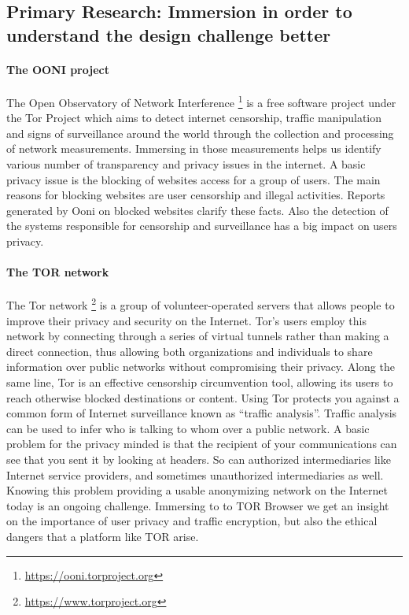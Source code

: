 \subsection{Primary Research: Immersion in order to understand the design 
challenge better}

\paragraph{The OONI project}

The Open Observatory of Network Interference 
\footnote{\url{https://ooni.torproject.org}} is a free software project under 
the Tor Project which aims to detect internet censorship, traffic manipulation 
and signs of surveillance around the world through the collection and processing 
of network measurements. Immersing in those measurements helps us identify 
various number of transparency and privacy issues in the internet.  
A basic privacy issue is the blocking of websites  access for a group of users. 
The main reasons for blocking websites are user censorship and illegal 
activities. Reports generated by Ooni  on blocked websites clarify these facts. 
Also the detection of the systems responsible for censorship and surveillance 
has a big impact on users privacy.

\paragraph{The TOR network}

The Tor network \footnote{\url{https://www.torproject.org}} is a group of 
volunteer-operated servers that allows people to 
improve their privacy and security on the Internet. Tor's users employ this 
network by connecting through a series of virtual tunnels rather than making a 
direct connection, thus allowing both organizations and individuals to share 
information over public networks without compromising their privacy. Along the 
same line, Tor is an effective censorship circumvention tool, allowing its users 
to reach otherwise blocked destinations or content.
Using Tor protects you against a common form of Internet surveillance known as 
``traffic analysis''. Traffic analysis can be used to infer who is talking to 
whom over a public network.
A basic problem for the privacy minded is that the recipient of your 
communications can see that you sent it by looking at headers. So can authorized 
intermediaries like Internet service providers, and sometimes unauthorized 
intermediaries as well.
Knowing this problem providing a usable anonymizing network on the Internet 
today is an ongoing challenge. Immersing to to TOR Browser we get an insight on 
the importance of user privacy and traffic encryption, but also the ethical 
dangers that a platform like TOR arise.   

